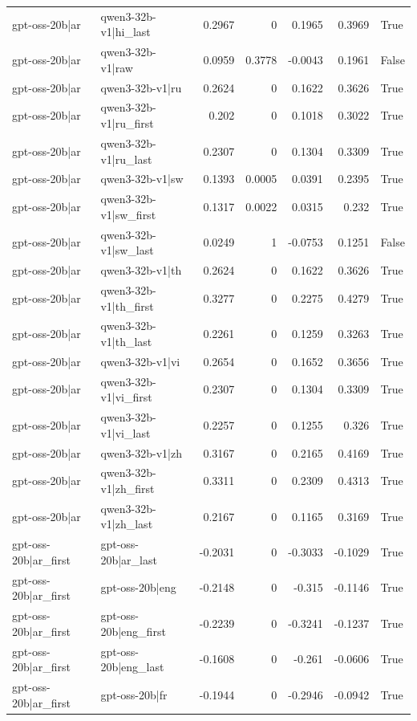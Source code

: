 \begin{table}
\begin{tabular}{l l r r r r l}
gpt-oss-20b|ar & qwen3-32b-v1|hi_last & 0.2967 & 0 & 0.1965 & 0.3969 & True \\
gpt-oss-20b|ar & qwen3-32b-v1|raw & 0.0959 & 0.3778 & -0.0043 & 0.1961 & False \\
gpt-oss-20b|ar & qwen3-32b-v1|ru & 0.2624 & 0 & 0.1622 & 0.3626 & True \\
gpt-oss-20b|ar & qwen3-32b-v1|ru_first & 0.202 & 0 & 0.1018 & 0.3022 & True \\
gpt-oss-20b|ar & qwen3-32b-v1|ru_last & 0.2307 & 0 & 0.1304 & 0.3309 & True \\
gpt-oss-20b|ar & qwen3-32b-v1|sw & 0.1393 & 0.0005 & 0.0391 & 0.2395 & True \\
gpt-oss-20b|ar & qwen3-32b-v1|sw_first & 0.1317 & 0.0022 & 0.0315 & 0.232 & True \\
gpt-oss-20b|ar & qwen3-32b-v1|sw_last & 0.0249 & 1 & -0.0753 & 0.1251 & False \\
gpt-oss-20b|ar & qwen3-32b-v1|th & 0.2624 & 0 & 0.1622 & 0.3626 & True \\
gpt-oss-20b|ar & qwen3-32b-v1|th_first & 0.3277 & 0 & 0.2275 & 0.4279 & True \\
gpt-oss-20b|ar & qwen3-32b-v1|th_last & 0.2261 & 0 & 0.1259 & 0.3263 & True \\
gpt-oss-20b|ar & qwen3-32b-v1|vi & 0.2654 & 0 & 0.1652 & 0.3656 & True \\
gpt-oss-20b|ar & qwen3-32b-v1|vi_first & 0.2307 & 0 & 0.1304 & 0.3309 & True \\
gpt-oss-20b|ar & qwen3-32b-v1|vi_last & 0.2257 & 0 & 0.1255 & 0.326 & True \\
gpt-oss-20b|ar & qwen3-32b-v1|zh & 0.3167 & 0 & 0.2165 & 0.4169 & True \\
gpt-oss-20b|ar & qwen3-32b-v1|zh_first & 0.3311 & 0 & 0.2309 & 0.4313 & True \\
gpt-oss-20b|ar & qwen3-32b-v1|zh_last & 0.2167 & 0 & 0.1165 & 0.3169 & True \\
gpt-oss-20b|ar_first & gpt-oss-20b|ar_last & -0.2031 & 0 & -0.3033 & -0.1029 & True \\
gpt-oss-20b|ar_first & gpt-oss-20b|eng & -0.2148 & 0 & -0.315 & -0.1146 & True \\
gpt-oss-20b|ar_first & gpt-oss-20b|eng_first & -0.2239 & 0 & -0.3241 & -0.1237 & True \\
gpt-oss-20b|ar_first & gpt-oss-20b|eng_last & -0.1608 & 0 & -0.261 & -0.0606 & True \\
gpt-oss-20b|ar_first & gpt-oss-20b|fr & -0.1944 & 0 & -0.2946 & -0.0942 & True \\

\end{tabular}
\end{table}
